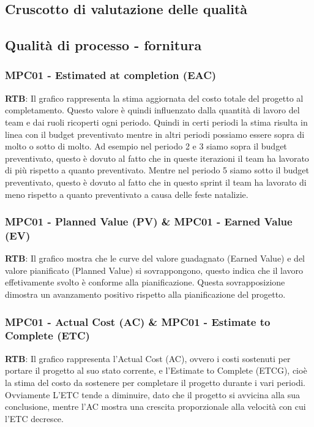 \documentclass[10pt]{article}
\begin{document}
\begin{justify}
\section{Cruscotto di valutazione delle qualità}
\subsection{Qualità di processo - fornitura}
\subsubsection{MPC01 - Estimated at completion (EAC)}
\textbf{RTB}: Il grafico rappresenta la stima aggiornata del costo totale del progetto al completamento. Questo valore è quindi influenzato dalla quantità di lavoro del team e dai ruoli ricoperti ogni periodo. Quindi in certi periodi la stima risulta in linea con il budget preventivato mentre in altri periodi possiamo essere sopra di molto o sotto di molto. Ad esempio nel periodo 2 e 3 siamo sopra il budget preventivato, questo è dovuto al fatto che in queste iterazioni il team ha lavorato di più rispetto a quanto preventivato. Mentre nel periodo 5 siamo sotto il budget preventivato, questo è dovuto al fatto che in questo sprint il team ha lavorato di meno rispetto a quanto preventivato a causa delle feste natalizie.\\
\subsubsection{MPC01 - Planned Value (PV) \& MPC01 - Earned Value (EV)}
\textbf{RTB}: Il grafico mostra che le curve del valore guadagnato (Earned Value) e del valore pianificato (Planned Value) si sovrappongono, questo indica che il lavoro effetivamente svolto è conforme alla pianificazione. Questa sovrapposizione dimostra un avanzamento positivo rispetto alla pianificazione del progetto.
\subsubsection{MPC01 - Actual Cost (AC) \& MPC01 - Estimate to Complete (ETC)}
\textbf{RTB}: Il grafico rappresenta l'Actual Cost (AC), ovvero i costi sostenuti per portare il progetto al suo stato corrente, e l'Estimate to Complete (ETCG), cioè la stima del costo da sostenere per completare il progetto durante i vari periodi. \\
Ovviamente L'ETC tende a diminuire, dato che il progetto si avvicina alla sua conclusione, mentre l'AC mostra una crescita proporzionale alla velocità con cui l'ETC decresce.

\end{justify}
\end{document}
